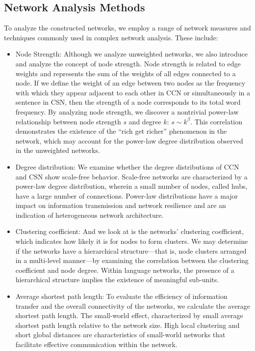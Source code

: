 \documentclass[11pt]{article}
\begin{document}
\subsection{Network Analysis Methods}
To analyze the constructed networks, we employ a range of network measures and techniques commonly used in complex network analysis. These include:

\begin{itemize}
    \item Node Strength: Although we analyze unweighted networks, we also introduce and analyze the concept of node strength. Node strength is related to edge weights and represents the sum of the weights of all edges connected to a node. If we define the weight of an edge between two nodes as the frequency with which they appear adjacent to each other in CCN or simultaneously in a sentence in CSN, then the strength of a node corresponds to its total word frequency.
    By analyzing node strength, we discover a nontrivial power-law relationship between node strength $s$ and degree $k$: $s \sim k^{\beta}$. This correlation demonstrates the existence of the ``rich get richer'' phenomenon in the network, which may account for the power-law degree distribution observed in the unweighted networks. 
    \item Degree distribution: We examine whether the degree distributions of CCN and CSN show scale-free behavior. Scale-free networks are characterized by a power-law degree distribution, wherein a small number of nodes, called hubs, have a large number of connections. Power-law distributions have a major impact on information transmission and network resilience and are an indication of heterogeneous network architecture.
    \item Clustering coefficient: And we look at is the networks' clustering coefficient, which indicates how likely it is for nodes to form clusters. We may determine if the networks have a hierarchical structure—that is, node clusters arranged in a multi-level manner—by examining the correlation between the clustering coefficient and node degree. Within language networks, the presence of a hierarchical structure implies the existence of meaningful sub-units.
    \item Average shortest path length: To evaluate the efficiency of information transfer and the overall connectivity of the networks, we calculate the average shortest path length. The small-world effect, characterized by small average shortest path length relative to the network size. High local clustering and short global distances are characteristics of small-world networks that facilitate effective communication within the network.

\end{itemize}
\end{document}
